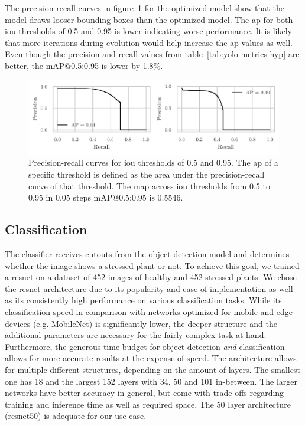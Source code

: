 \documentclass[draft,final]{vutinfth} %
\begin{document}
The precision-recall curves in figure~\ref{fig:yolo-ap-hyp} for the
optimized model show that the model draws looser bounding boxes than
the optimized model. The \gls{ap} for both \gls{iou} thresholds of 0.5
and 0.95 is lower indicating worse performance. It is likely that more
iterations during evolution would help increase the \gls{ap} values as
well. Even though the precision and recall values from
table~\ref{tab:yolo-metrics-hyp} are better, the \textsf{mAP}@0.5:0.95
is lower by 1.8\%.

\begin{figure}
  \centering
  \includegraphics{graphics/APpt5-pt95-final.pdf}
  \caption[Hyper-parameter optimized object detection AP@0.5 and
  AP@0.95.]{Precision-recall curves for \gls{iou} thresholds of 0.5
    and 0.95. The \gls{ap} of a specific threshold is defined as the
    area under the precision-recall curve of that threshold. The
    \gls{map} across \gls{iou} thresholds from 0.5 to 0.95 in 0.05
    steps \textsf{mAP}@0.5:0.95 is 0.5546.}
  \label{fig:yolo-ap-hyp}
\end{figure}

\subsection{Classification}
\label{ssec:classifier-eval}

The classifier receives cutouts from the object detection model and
determines whether the image shows a stressed plant or not. To achieve
this goal, we trained a \gls{resnet} \cite{he2016} on a dataset of 452
images of healthy and 452 stressed plants. We chose the \gls{resnet}
architecture due to its popularity and ease of implementation as well
as its consistently high performance on various classification
tasks. While its classification speed in comparison with networks
optimized for mobile and edge devices (e.g. MobileNet) is
significantly lower, the deeper structure and the additional
parameters are necessary for the fairly complex task at
hand. Furthermore, the generous time budget for object detection
\emph{and} classification allows for more accurate results at the
expense of speed. The architecture allows for multiple different
structures, depending on the amount of layers. The smallest one has 18
and the largest 152 layers with 34, 50 and 101 in-between. The larger
networks have better accuracy in general, but come with trade-offs
regarding training and inference time as well as required space. The
50 layer architecture (\gls{resnet}50) is adequate for our use case.
\end{document}
